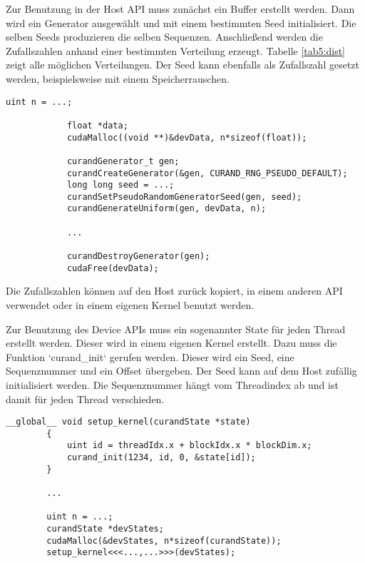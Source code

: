             Zur Benutzung in der Host \Gls{API} muss zunächst ein Buffer erstellt werden. Dann wird ein Generator ausgewählt und mit einem bestimmten Seed initialisiert. Die selben Seeds produzieren die selben Sequenzen. Anschlie\ss end werden die Zufallszahlen anhand einer bestimmten Verteilung erzeugt. Tabelle \ref{tab5:dist} zeigt alle möglichen Verteilungen. Der Seed kann ebenfalls als Zufallszahl gesetzt werden, beispielsweise mit einem Speicherrauschen.
			\begin{lstlisting}[caption=cuRAND: Host API]
			uint n = ...;			
			
			float *data;
			cudaMalloc((void **)&devData, n*sizeof(float));
			
			curandGenerator_t gen;
			curandCreateGenerator(&gen, CURAND_RNG_PSEUDO_DEFAULT);
			long long seed = ...;
			curandSetPseudoRandomGeneratorSeed(gen, seed);
			curandGenerateUniform(gen, devData, n);
			
			...
			
			curandDestroyGenerator(gen);
			cudaFree(devData);
			\end{lstlisting}	
					
            Die Zufallszahlen können auf den Host zurück kopiert, in einem anderen \Gls{API} verwendet oder in einem eigenen \Gls{Kernel} benutzt werden.

            Zur Benutzung des Device \Glspl{API} muss ein sogenannter State für jeden \Gls{Thread} erstellt werden. Dieser wird in einem eigenen \Gls{Kernel} erstellt.
            Dazu muss die Funktion \li`curand_init` gerufen werden. Dieser wird ein Seed, eine Sequenznummer und ein Offset übergeben. Der Seed kann auf dem Host zufällig initialisiert werden. Die Sequenznummer hängt vom \Gls{Thread}index ab und ist damit für jeden \Gls{Thread} verschieden.
            \begin{lstlisting}[caption=cuRAND: Device API States]
        __global__ void setup_kernel(curandState *state)
        {
            uint id = threadIdx.x + blockIdx.x * blockDim.x;
            curand_init(1234, id, 0, &state[id]);
        }
			
        ...
			
        uint n = ...;
        curandState *devStates;
        cudaMalloc(&devStates, n*sizeof(curandState));
        setup_kernel<<<...,...>>>(devStates);		
            \end{lstlisting}
            

